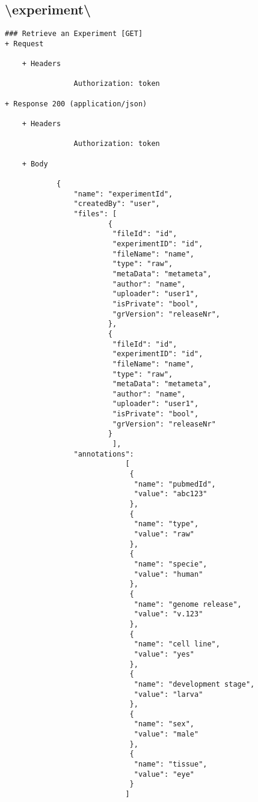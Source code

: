 \subsection*{\textbackslash experiment\textbackslash <experiment-id>}
\begin{verbatim}
### Retrieve an Experiment [GET]
+ Request 

    + Headers
    
                Authorization: token
                
+ Response 200 (application/json)

    + Headers
    
                Authorization: token
       
    + Body 
    
            {
                "name": "experimentId",
                "createdBy": "user",
                "files": [
                        { 
                         "fileId": "id",
                         "experimentID": "id",
                         "fileName": "name",
                         "type": "raw",
                         "metaData": "metameta",
                         "author": "name",
                         "uploader": "user1",
                         "isPrivate": "bool",
                         "grVersion": "releaseNr",
                        },
                        { 
                         "fileId": "id",
                         "experimentID": "id",
                         "fileName": "name",
                         "type": "raw",
                         "metaData": "metameta",
                         "author": "name",
                         "uploader": "user1",
                         "isPrivate": "bool",
                         "grVersion": "releaseNr"
                        }
                         ],
                "annotations": 
                            [
                             {
                              "name": "pubmedId",
                              "value": "abc123"
                             }, 
                             {
                              "name": "type",
                              "value": "raw"
                             },
                             {
                              "name": "specie",
                              "value": "human"
                             },
                             {
                              "name": "genome release",
                              "value": "v.123"
                             },
                             {
                              "name": "cell line",
                              "value": "yes"
                             },
                             {
                              "name": "development stage",
                              "value": "larva"
                             },
                             {
                              "name": "sex",
                              "value": "male"
                             },
                             {
                              "name": "tissue",
                              "value": "eye"
                             }
                            ]
                

\end{verbatim}
